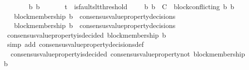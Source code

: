 \begin{isabellebody}
\isamarkupfalse%
\ {\isacharminus}\isanewline
\ \ \isamarkupfalse%
\ {\isasymsigma}{}\ {\isasymsigma}{}\ b{}\ b{}\isanewline
\ \ \isamarkupfalse%
\ {\isachardoublequoteopen}{\isacharbraceleft}{\isasymsigma}{}{\isacharcomma}\ {\isasymsigma}{}{\isacharbraceright}\ {\isasymsubseteq}\ {\isasymSigma}t{\isachardoublequoteclose}\ \ {\isachardoublequoteopen}is{\isacharunderscore}faults{\isacharunderscore}lt{\isacharunderscore}threshold\ {\isacharparenleft}{\isasymsigma}{}\ {\isasymunion}\ {\isasymsigma}{}{\isacharparenright}{\isachardoublequoteclose}\ \ {\isachardoublequoteopen}{\isacharbraceleft}b{}{\isacharcomma}\ b{}{\isacharbraceright}\ {\isasymsubseteq}\ C\ {\isasymand}\ block{\isacharunderscore}conflicting\ {\isacharparenleft}b{}{\isacharcomma}\ b{}{\isacharparenright}{\isachardoublequoteclose}\ \isanewline
\ \ \ {\isachardoublequoteopen}block{\isacharunderscore}membership\ b{}\ {\isasymin}\ consensus{\isacharunderscore}value{\isacharunderscore}property{\isacharunderscore}decisions\ {\isasymsigma}{}{\isachardoublequoteclose}\ \isanewline
\ \ \ {\isachardoublequoteopen}block{\isacharunderscore}membership\ b{}\ {\isasymin}\ consensus{\isacharunderscore}value{\isacharunderscore}property{\isacharunderscore}decisions\ {\isasymsigma}{}{\isachardoublequoteclose}\ \isanewline
\ \ \isamarkupfalse%
\ {\isachardoublequoteopen}consensus{\isacharunderscore}value{\isacharunderscore}property{\isacharunderscore}is{\isacharunderscore}decided\ {\isacharparenleft}block{\isacharunderscore}membership\ b{}{\isacharcomma}\ {\isasymsigma}{}{\isacharparenright}{\isachardoublequoteclose}\isanewline
\ \ \ \ \isamarkupfalse%
\ {\isacharparenleft}simp\ add{\isacharcolon}\ consensus{\isacharunderscore}value{\isacharunderscore}property{\isacharunderscore}decisions{\isacharunderscore}def{\isacharparenright}\isanewline
\ \ \isamarkupfalse%
\ {\isachardoublequoteopen}{\isasymnot}\ consensus{\isacharunderscore}value{\isacharunderscore}property{\isacharunderscore}is{\isacharunderscore}decided\ {\isacharparenleft}consensus{\isacharunderscore}value{\isacharunderscore}property{\isacharunderscore}not\ {\isacharparenleft}block{\isacharunderscore}membership\ b{}{\isacharparenright}{\isacharcomma}\ {\isasymsigma}{}{\isacharparenright}{\isachardoublequoteclose}\ \ \ \ \ \ \isanewline

\end{isabellebody}
